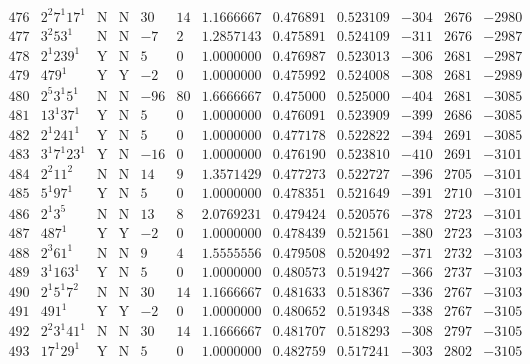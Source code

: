\documentclass[11pt,reqno,a4letter]{article}
\numberwithin{figure}{section}
\numberwithin{table}{section}
\theoremstyle{plain}
\numberwithin{theorem}{section}
\theoremstyle{definition}
\begin{document}
\begin{table}[ht]
\begin{equation*}
{\begin{array}{cc|cc|ccc|cc|ccc}
 476 & 2^2 7^1 17^1 & \text{N} & \text{N} & 30 & 14 & 1.1666667 & 0.476891 & 0.523109 & -304 & 2676 & -2980 \\
 477 & 3^2 53^1 & \text{N} & \text{N} & -7 & 2 & 1.2857143 & 0.475891 & 0.524109 & -311 & 2676 & -2987 \\
 478 & 2^1 239^1 & \text{Y} & \text{N} & 5 & 0 & 1.0000000 & 0.476987 & 0.523013 & -306 & 2681 & -2987 \\
 479 & 479^1 & \text{Y} & \text{Y} & -2 & 0 & 1.0000000 & 0.475992 & 0.524008 & -308 & 2681 & -2989 \\
 480 & 2^5 3^1 5^1 & \text{N} & \text{N} & -96 & 80 & 1.6666667 & 0.475000 & 0.525000 & -404 & 2681 & -3085 \\
 481 & 13^1 37^1 & \text{Y} & \text{N} & 5 & 0 & 1.0000000 & 0.476091 & 0.523909 & -399 & 2686 & -3085 \\
 482 & 2^1 241^1 & \text{Y} & \text{N} & 5 & 0 & 1.0000000 & 0.477178 & 0.522822 & -394 & 2691 & -3085 \\
 483 & 3^1 7^1 23^1 & \text{Y} & \text{N} & -16 & 0 & 1.0000000 & 0.476190 & 0.523810 & -410 & 2691 & -3101 \\
 484 & 2^2 11^2 & \text{N} & \text{N} & 14 & 9 & 1.3571429 & 0.477273 & 0.522727 & -396 & 2705 & -3101 \\
 485 & 5^1 97^1 & \text{Y} & \text{N} & 5 & 0 & 1.0000000 & 0.478351 & 0.521649 & -391 & 2710 & -3101 \\
 486 & 2^1 3^5 & \text{N} & \text{N} & 13 & 8 & 2.0769231 & 0.479424 & 0.520576 & -378 & 2723 & -3101 \\
 487 & 487^1 & \text{Y} & \text{Y} & -2 & 0 & 1.0000000 & 0.478439 & 0.521561 & -380 & 2723 & -3103 \\
 488 & 2^3 61^1 & \text{N} & \text{N} & 9 & 4 & 1.5555556 & 0.479508 & 0.520492 & -371 & 2732 & -3103 \\
 489 & 3^1 163^1 & \text{Y} & \text{N} & 5 & 0 & 1.0000000 & 0.480573 & 0.519427 & -366 & 2737 & -3103 \\
 490 & 2^1 5^1 7^2 & \text{N} & \text{N} & 30 & 14 & 1.1666667 & 0.481633 & 0.518367 & -336 & 2767 & -3103 \\
 491 & 491^1 & \text{Y} & \text{Y} & -2 & 0 & 1.0000000 & 0.480652 & 0.519348 & -338 & 2767 & -3105 \\
 492 & 2^2 3^1 41^1 & \text{N} & \text{N} & 30 & 14 & 1.1666667 & 0.481707 & 0.518293 & -308 & 2797 & -3105 \\
 493 & 17^1 29^1 & \text{Y} & \text{N} & 5 & 0 & 1.0000000 & 0.482759 & 0.517241 & -303 & 2802 & -3105 \\

\end{array}}
\end{equation*}
\end{table}
\end{document}

